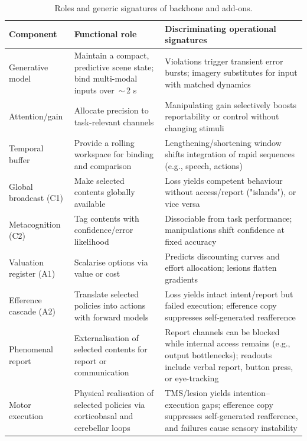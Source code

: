 \documentclass[11pt]{article}
\begin{document}
\begin{table}[ht]
\centering
\footnotesize
\begin{tabular}{@{}l p{5.2cm} p{6.2cm}@{}}
\toprule
Component & Functional role & Discriminating operational signatures \\
\midrule
Generative model & Maintain a compact, predictive scene state; bind multi-modal inputs over \,$\sim$\,2 s \cite{burgess2019monet,greff2019iodine,locatello2020slot} & Violations trigger transient error bursts; imagery substitutes for input with matched dynamics \\
Attention/gain & Allocate precision to task-relevant channels \cite{locatello2020slot} & Manipulating gain selectively boosts reportability or control without changing stimuli \\
Temporal buffer & Provide a rolling workspace for binding and comparison \cite{kirchhoff2018markov,Kirchhoff2018} & Lengthening/shortening window shifts integration of rapid sequences (e.g., speech, actions) \\
Global broadcast (C1) & Make selected contents globally available \cite{kirchhoff2018markov,Kirchhoff2018} & Loss yields competent behaviour without access/report ("islands"), or vice versa \\
Metacognition (C2) & Tag contents with confidence/error likelihood \cite{Kirchhoff2018} & Dissociable from task performance; manipulations shift confidence at fixed accuracy \\
Valuation register (A1) & Scalarise options via value or cost \cite{Kirchhoff2018} & Predicts discounting curves and effort allocation; lesions flatten gradients \\
Efference cascade (A2) & Translate selected policies into actions with forward models \cite{Kirchhoff2018} & Loss yields intact intent/report but failed execution; efference copy suppresses self-generated reafference \\
Phenomenal report & Externalisation of selected contents for report or communication \cite{Kirchhoff2018} & Report channels can be blocked while internal access remains (e.g., output bottlenecks); readouts include verbal report, button press, or eye-tracking \\
Motor execution & Physical realisation of selected policies via corticobasal and cerebellar loops \cite{Kirchhoff2018} & TMS/lesion yields intention–execution gaps; efference copy suppresses self-generated reafference, and failures cause sensory instability \\
\bottomrule
\end{tabular}
\caption{Roles and generic signatures of backbone and add-ons.}
\label{tab:roles}
\end{table}
\end{document}
